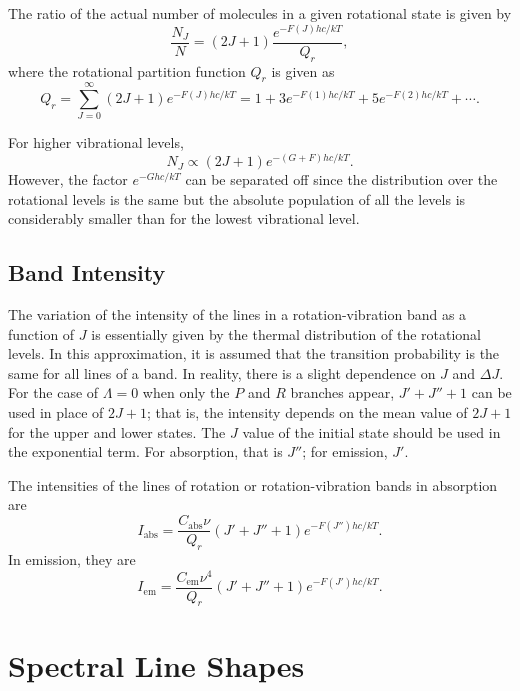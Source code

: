 \documentclass[11pt, twoside, fleqn]{report}
\newcommand{\up}{\text}
\newcommand{\eul}{e}
\begin{document}
The ratio of the actual number of molecules in a given rotational state is given by
\begin{equation*}
    \frac{N_J}{N} = (2J + 1)\frac{\eul^{-F(J)hc/kT}}{Q_r},
\end{equation*}
where the rotational partition function $Q_r$ is given as
\begin{equation}
    Q_r = \sum_{J=0}^{\infty}(2J + 1)\eul^{-F(J)hc/kT} = 1 + 3\eul^{-F(1)hc/kT} + 5\eul^{-F(2)hc/kT} + \dotsb.
\end{equation}

For higher vibrational levels,
\begin{equation}
    N_J \propto (2J + 1)\eul^{-(G + F)hc/kT}.
\end{equation}
However, the factor $\eul^{-Ghc/kT}$ can be separated off since the distribution over the rotational levels is the same but the absolute population of all the levels is considerably smaller than for the lowest vibrational level.

\section{Band Intensity}
\label{s:band_intensity}

The variation of the intensity of the lines in a rotation-vibration band as a function of $J$ is essentially given by the thermal distribution of the rotational levels. In this approximation, it is assumed that the transition probability is the same for all lines of a band. In reality, there is a slight dependence on $J$ and $\Delta{}J$. For the case of $\Lambda = 0$ when only the $P$ and $R$ branches appear, $J' + J'' + 1$ can be used in place of $2J + 1$; that is, the intensity depends on the mean value of $2J + 1$ for the upper and lower states. The $J$ value of the initial state should be used in the exponential term. For absorption, that is $J''$; for emission, $J'$.

The intensities of the lines of rotation or rotation-vibration bands in absorption are
\begin{equation}
    I_\up{abs} = \frac{C_\up{abs}\nu}{Q_r}(J' + J'' + 1)\eul^{-F(J'')hc/kT}.
\end{equation}
In emission, they are
\begin{equation}
    I_\up{em} = \frac{C_\up{em}\nu^4}{Q_r}(J' + J'' + 1)\eul^{-F(J')hc/kT}.
\end{equation}

\chapter{Spectral Line Shapes}
\label{c:spectral_line_shapes}
\end{document}
